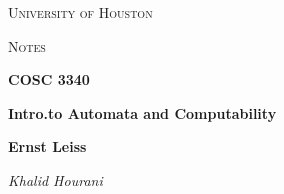 \documentclass[a4paper]{article}
\theoremstyle{definition}
\begin{document}
\begin{titlepage}
	\centering
	{\scshape\LARGE University of Houston\par}
	\vspace{1cm}
	{\scshape\Large Notes \par}
	\vspace{1.5cm}
	{\huge\bfseries COSC 3340 \par}
	{\huge\bfseries Intro.\@ to Automata and Computability \par}
	\vspace{0.5cm}
	{\large\bfseries Ernst Leiss\par}
	\vspace{1cm}
	{\Large\textit{Khalid Hourani}}
	\vspace{0.5cm}
	{\large \par} %
	\vfill
\end{titlepage}

\tableofcontents
\newpage{}




\end{document}
